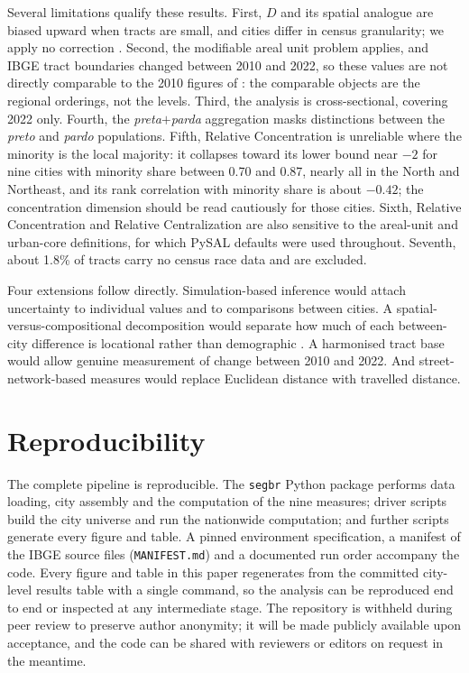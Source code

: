 \documentclass[12pt,a4paper]{article}
\begin{document}
Several limitations qualify these results. First, $D$ and its spatial analogue are biased upward when tracts are small, and cities differ in census granularity; we apply no correction \citep{cortese1976further, carrington1997measuring, allen2015more}. Second, the modifiable areal unit problem applies, and IBGE tract boundaries changed between 2010 and 2022, so these values are not directly comparable to the 2010 figures of \citet{deSouza2023nationwide_english}: the comparable objects are the regional orderings, not the levels. Third, the analysis is cross-sectional, covering 2022 only. Fourth, the \emph{preta}$+$\emph{parda} aggregation masks distinctions between the \emph{preto} and \emph{pardo} populations. Fifth, Relative Concentration is unreliable where the minority is the local majority: it collapses toward its lower bound near $-2$ for nine cities with minority share between 0.70 and 0.87, nearly all in the North and Northeast, and its rank correlation with minority share is about $-0.42$; the concentration dimension should be read cautiously for those cities. Sixth, Relative Concentration and Relative Centralization are also sensitive to the areal-unit and urban-core definitions, for which PySAL defaults were used throughout. Seventh, about 1.8\% of tracts carry no census race data and are excluded.

Four extensions follow directly. Simulation-based inference would attach uncertainty to individual values and to comparisons between cities. A spatial-versus-compositional decomposition would separate how much of each between-city difference is locational rather than demographic \citep{rey2021comparative}. A harmonised tract base would allow genuine measurement of change between 2010 and 2022. And street-network-based measures would replace Euclidean distance with travelled distance.

\section{Reproducibility}\label{sec:repro}

The complete pipeline is reproducible. The \texttt{segbr} Python package performs data loading, city assembly and the computation of the nine measures; driver scripts build the city universe and run the nationwide computation; and further scripts generate every figure and table. A pinned environment specification, a manifest of the IBGE source files (\texttt{MANIFEST.md}) and a documented run order accompany the code. Every figure and table in this paper regenerates from the committed city-level results table with a single command, so the analysis can be reproduced end to end or inspected at any intermediate stage. The repository is withheld during peer review to preserve author anonymity; it will be made publicly available upon acceptance, and the code can be shared with reviewers or editors on request in the meantime.
\end{document}
